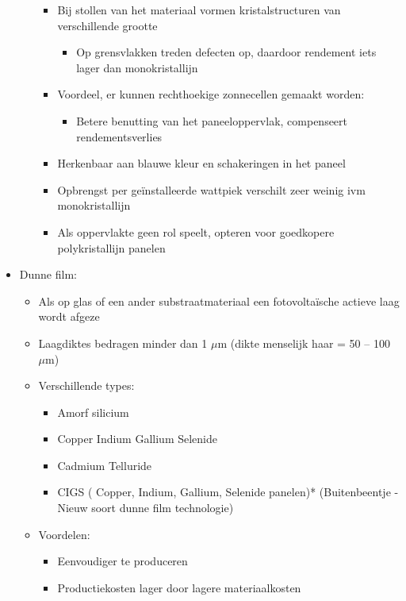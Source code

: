 \documentclass[12pt]{article}
\begin{document}
\begin{itemize}
\begin{itemize}
\begin{itemize}
            \item Bij stollen van het materiaal vormen kristalstructuren van verschillende grootte\begin{itemize}
                \item Op grensvlakken treden defecten op, daardoor rendement iets lager dan monokristallijn
            \end{itemize}
            \item Voordeel, er kunnen rechthoekige zonnecellen gemaakt worden:\begin{itemize}
                \item Betere benutting van het paneeloppervlak, compenseert rendementsverlies
            \end{itemize}
            \item Herkenbaar aan blauwe kleur en schakeringen in het paneel
            \item Opbrengst per geïnstalleerde wattpiek verschilt zeer weinig ivm monokristallijn
            \item Als oppervlakte geen rol speelt, opteren voor goedkopere polykristallijn panelen
        \end{itemize}
    \end{itemize}
    \item Dunne film:\begin{itemize}
        \item Als op glas of een ander substraatmateriaal een fotovoltaïsche actieve laag wordt afgeze
        \item Laagdiktes bedragen minder dan 1 $\mu$m (dikte menselijk haar = 50 – 100 $\mu$m)
        \item Verschillende types:\begin{itemize}
            \item Amorf silicium 
            \item Copper Indium Gallium Selenide
            \item Cadmium Telluride
            \item CIGS ( Copper, Indium, Gallium, Selenide panelen)* (Buitenbeentje -Nieuw soort dunne film technologie)
        \end{itemize}
        \item Voordelen:\begin{itemize}
            \item Eenvoudiger te produceren
            \item Productiekosten lager door lagere materiaalkosten
        \end{itemize}

\end{itemize}
\end{itemize}
\end{document}

